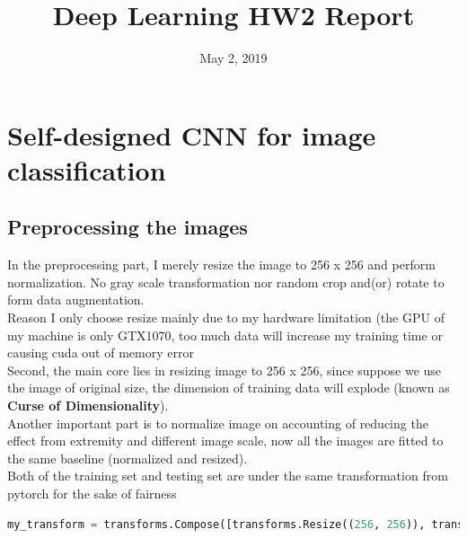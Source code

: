 \documentclass[11pt, a4paper]{article} %
\title{Deep Learning HW2 Report} %
\begin{document}


\date{May 2, 2019}

\maketitle{} %

\setcounter{page}{1} %

\section{Self-designed CNN for image classification} %
\subsection{Preprocessing the images} %
In the preprocessing part, I merely resize the image to 256 x 256 and perform normalization. No gray scale transformation nor random crop and(or) rotate to form data augmentation.
\\ Reason I only choose resize mainly due to my hardware limitation (the GPU of my machine is only GTX1070, too much data will increase my training time or causing cuda out of memory error
\\ Second, the main core lies in resizing image to 256 x 256, since suppose we use the image of original size, the dimension of training data will explode (known as \textbf{Curse of Dimensionality}). 
\\ Another important part is to normalize image on accounting of reducing the effect from extremity and different image scale, now all the images are fitted to the same baseline (normalized and resized).
\\ Both of the training set and testing set are under the same transformation from pytorch for the sake of fairness
\begin{lstlisting}[language = python]
my_transform = transforms.Compose([transforms.Resize((256, 256)), transforms.ToTensor(), transforms.Normalize((0.5, 0.5, 0.5), (0.5, 0.5, 0.5))]) 
\end{lstlisting}
\end{document}

